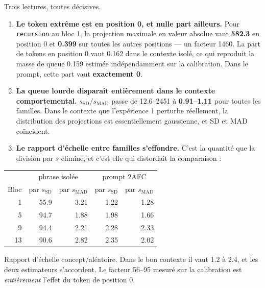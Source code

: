 \documentclass[11pt,a4paper]{article}
\newcommand{\ssd}{s_{\mathrm{SD}}}
\newcommand{\smad}{s_{\mathrm{MAD}}}
\newcommand{\code}[1]{\texttt{\small #1}}
\begin{document}
\noindent
Trois lectures, toutes décisives.

\begin{enumerate}
\item \textbf{Le token extrême est en position 0, et nulle part ailleurs.} Pour
      \code{recursion} au bloc 1, la projection maximale en valeur absolue vaut
      \textbf{\num{582.3}} en position 0 et \textbf{\num{0.399}} sur toutes les autres
      positions --- un facteur \num{1460}. La part de tokens en position 0 vaut
      \num{0.162} dans le contexte isolé, ce qui reproduit la masse de queue
      \num{0.159} estimée indépendamment sur la calibration. Dans le prompt, cette part
      vaut \textbf{exactement \num{0}}.
\item \textbf{La queue lourde disparaît entièrement dans le contexte comportemental.}
      $\ssd/\smad$ passe de \num{12.6}--\num{2451} à \textbf{\num{0.91}--\num{1.11}} pour
      toutes les familles. Dans le contexte que l'expérience 1 perturbe réellement, la
      distribution des projections est essentiellement gaussienne, et SD et MAD
      coïncident.
\item \textbf{Le rapport d'échelle entre familles s'effondre.} C'est la quantité que la
      division par $s$ élimine, et c'est elle qui distordait la comparaison :
\end{enumerate}

\begin{center}
\begin{tabular}{rrrrr}
\toprule
& \multicolumn{2}{c}{phrase isolée} & \multicolumn{2}{c}{prompt 2AFC} \\
Bloc & par $\ssd$ & par $\smad$ & par $\ssd$ & par $\smad$ \\
\midrule
1  & \num{55.9} & \num{3.21} & \num{1.22} & \num{1.28} \\
5  & \num{94.7} & \num{1.88} & \num{1.98} & \num{1.66} \\
9  & \num{94.4} & \num{2.21} & \num{2.28} & \num{2.33} \\
13 & \num{90.6} & \num{2.82} & \num{2.35} & \num{2.02} \\
\bottomrule
\end{tabular}
\end{center}

\noindent
Rapport d'échelle concept/aléatoire. Dans le bon contexte il vaut \num{1.2} à
\num{2.4}, et les deux estimateurs s'accordent. Le facteur \num{56}--\num{95} mesuré sur
la calibration est \emph{entièrement} l'effet du token de position 0.
\end{document}
